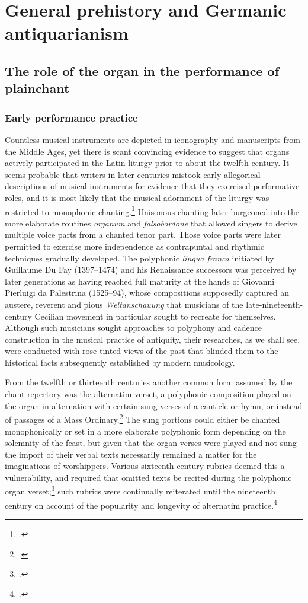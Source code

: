 \chapter{General prehistory and Germanic antiquarianism}
\section{The role of the organ in the performance of plainchant}
\subsection{Early performance practice}
Countless musical instruments are depicted in iconography and manuscripts from the Middle Ages, yet there is scant convincing evidence to suggest that organs actively participated in the Latin liturgy prior to about the twelfth century.
It seems probable that writers in later centuries mistook early allegorical descriptions of musical instruments for evidence that they exercised performative roles, and it is most likely that the musical adornment of the liturgy was restricted to monophonic chanting.\footcite[23]{McKinnonMusicalInstrumentsMedieval1968}
Unisonous chanting later burgeoned into the more elaborate routines \emph{organum} and \emph{falsobordone} that allowed singers to derive multiple voice parts from a chanted tenor part.
Those voice parts were later permitted to exercise more independence as contrapuntal and rhythmic techniques gradually developed.
The polyphonic \emph{lingua franca} initiated by Guillaume Du Fay (1397--1474) and his Renaissance successors was perceived by later generations as having reached full maturity at the hands of Giovanni Pierluigi da Palestrina (1525--94), whose compositions supposedly captured an austere, reverent and pious \emph{Weltanschauung} that musicians of the late-nineteenth-century Cecilian movement in particular sought to recreate for themselves.
Although such musicians sought approaches to polyphony and cadence construction in the musical practice of antiquity, their researches, as we shall see, were conducted with rose-tinted views of the past that blinded them to the historical facts subsequently established by modern musicology.

From the twelfth or thirteenth centuries another common form assumed by the chant repertory was the alternatim verset, a polyphonic composition played on the organ in alternation with certain sung verses of a canticle or hymn, or instead of passages of a Mass Ordinary.\footcite[287--9]{vanWyeRitualUseOrgan1980}
The sung portions could either be chanted monophonically or set in a more elaborate polyphonic form depending on the solemnity of the feast, but given that the organ verses were played and not sung the import of their verbal texts necessarily remained a matter for the imaginations of worshippers.
Various sixteenth-century rubrics deemed this a vulnerability, and required that omitted texts be recited during the polyphonic organ verset;\footcite[93]{PrasslAnmerkungenzurOrgelbegleitung2012} such rubrics were continually reiterated until the nineteenth century on account of the popularity and longevity of alternatim practice.\footcite[See, for example, ][358--9]{Enchiridionsanctorumrituum1856}

